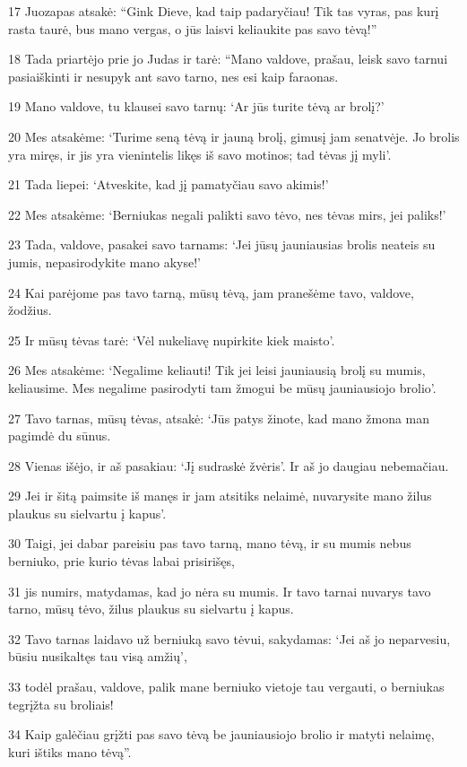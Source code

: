 \par 17 Juozapas atsakė: “Gink Dieve, kad taip padaryčiau! Tik tas vyras, pas kurį rasta taurė, bus mano vergas, o jūs laisvi keliaukite pas savo tėvą!” 
\par 18 Tada priartėjo prie jo Judas ir tarė: “Mano valdove, prašau, leisk savo tarnui pasiaiškinti ir nesupyk ant savo tarno, nes esi kaip faraonas. 
\par 19 Mano valdove, tu klausei savo tarnų: ‘Ar jūs turite tėvą ar brolį?’ 
\par 20 Mes atsakėme: ‘Turime seną tėvą ir jauną brolį, gimusį jam senatvėje. Jo brolis yra miręs, ir jis yra vienintelis likęs iš savo motinos; tad tėvas jį myli’. 
\par 21 Tada liepei: ‘Atveskite, kad jį pamatyčiau savo akimis!’ 
\par 22 Mes atsakėme: ‘Berniukas negali palikti savo tėvo, nes tėvas mirs, jei paliks!’ 
\par 23 Tada, valdove, pasakei savo tarnams: ‘Jei jūsų jauniausias brolis neateis su jumis, nepasirodykite mano akyse!’ 
\par 24 Kai parėjome pas tavo tarną, mūsų tėvą, jam pranešėme tavo, valdove, žodžius. 
\par 25 Ir mūsų tėvas tarė: ‘Vėl nukeliavę nupirkite kiek maisto’. 
\par 26 Mes atsakėme: ‘Negalime keliauti! Tik jei leisi jauniausią brolį su mumis, keliausime. Mes negalime pasirodyti tam žmogui be mūsų jauniausiojo brolio’. 
\par 27 Tavo tarnas, mūsų tėvas, atsakė: ‘Jūs patys žinote, kad mano žmona man pagimdė du sūnus. 
\par 28 Vienas išėjo, ir aš pasakiau: ‘Jį sudraskė žvėris’. Ir aš jo daugiau nebemačiau. 
\par 29 Jei ir šitą paimsite iš manęs ir jam atsitiks nelaimė, nuvarysite mano žilus plaukus su sielvartu į kapus’. 
\par 30 Taigi, jei dabar pareisiu pas tavo tarną, mano tėvą, ir su mumis nebus berniuko, prie kurio tėvas labai prisirišęs, 
\par 31 jis numirs, matydamas, kad jo nėra su mumis. Ir tavo tarnai nuvarys tavo tarno, mūsų tėvo, žilus plaukus su sielvartu į kapus. 
\par 32 Tavo tarnas laidavo už berniuką savo tėvui, sakydamas: ‘Jei aš jo neparvesiu, būsiu nusikaltęs tau visą amžių’, 
\par 33 todėl prašau, valdove, palik mane berniuko vietoje tau vergauti, o berniukas tegrįžta su broliais! 
\par 34 Kaip galėčiau grįžti pas savo tėvą be jauniausiojo brolio ir matyti nelaimę, kuri ištiks mano tėvą”.



